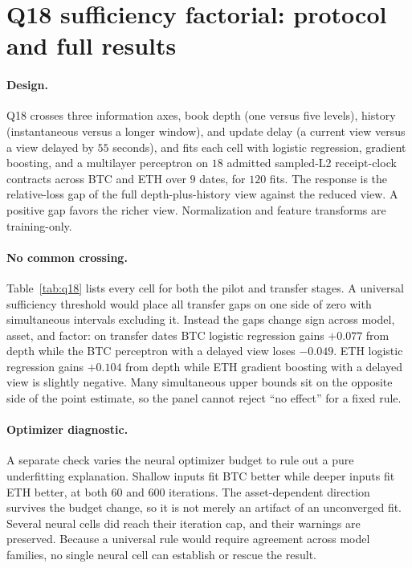\section{Q18 sufficiency factorial: protocol and full results}
\label{app:q18}

\paragraph{Design.} Q18 crosses three information axes, book depth (one versus five
levels), history (instantaneous versus a longer window), and update delay (a current view
versus a view delayed by $55$ seconds), and fits each cell with logistic regression,
gradient boosting, and a multilayer perceptron on $18$ admitted sampled-L2 receipt-clock
contracts across BTC and ETH over $9$ dates, for $120$ fits. The response is the
relative-loss gap of the full depth-plus-history view against the reduced view. A positive
gap favors the richer view. Normalization and feature transforms are training-only.

\paragraph{No common crossing.} Table~\ref{tab:q18} lists every cell for both the pilot and
transfer stages. A universal sufficiency threshold would place all transfer gaps on one side
of zero with simultaneous intervals excluding it. Instead the gaps change sign across model,
asset, and factor: on transfer dates BTC logistic regression gains $+0.077$ from depth while
the BTC perceptron with a delayed view loses $-0.049$. ETH logistic regression gains $+0.104$
from depth while ETH gradient boosting with a delayed view is slightly negative. Many
simultaneous upper bounds sit on the opposite side of the point estimate, so the panel cannot
reject ``no effect'' for a fixed rule.



\paragraph{Optimizer diagnostic.} A separate check varies the neural optimizer budget to
rule out a pure underfitting explanation. Shallow inputs fit BTC better while deeper inputs
fit ETH better, at both $60$ and $600$ iterations. The asset-dependent direction survives the
budget change, so it is not merely an artifact of an unconverged fit. Several neural cells
did reach their iteration cap, and their warnings are preserved. Because a universal rule
would require agreement across model families, no single neural cell can establish or rescue
the result.

